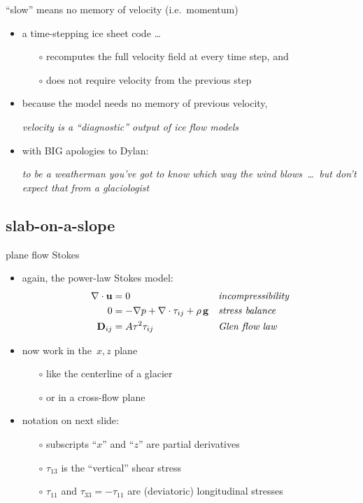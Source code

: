 \begin{frame}{``slow'' means no memory of velocity (i.e.~momentum)}

\begin{itemize}
\item a time-stepping ice sheet code \dots
  \begin{itemize}
  \item[$\circ$] recomputes the full velocity field at every time step, and
  \item[$\circ$] does not require velocity from the previous step
  \end{itemize}

\medskip
\item because the model needs no memory of previous velocity,

\smallskip
\emph{velocity is a ``diagnostic'' output of ice flow models}

\bigskip
\item with BIG apologies to Dylan:

\smallskip
\emph{to be a weatherman you've got to know which way the wind blows \,\dots\, but don't
expect that from a glaciologist}
\end{itemize}
\end{frame}


\subsection{slab-on-a-slope}

\begin{frame}{plane flow Stokes}

\begin{itemize}
\item again, the power-law Stokes model:
\begin{align*}
\nabla \cdot \mathbf{u} &= 0 &&\text{\emph{incompressibility}} \\
0 &= - \nabla p + \nabla \cdot \tau_{ij} + \rho\, \mathbf{g} &&\text{\emph{stress balance}} \\
\mathbf{D}_{ij} &= A \tau^2 \tau_{ij} &&\text{\emph{Glen flow law}}
\end{align*}

\bigskip
\item now work in the\, $x,z$ plane
  \begin{itemize}
  \item[$\circ$] like the centerline of a glacier
  \item[$\circ$] or in a cross-flow plane
  \end{itemize}

\item notation on next slide:
  \begin{itemize}
  \item[$\circ$] subscripts ``$x$'' and ``$z$'' are partial derivatives
  \item[$\circ$] $\tau_{13}$ is the ``vertical'' shear stress
  \item[$\circ$] $\tau_{11}$ and $\tau_{33}=-\tau_{11}$ are (deviatoric) longitudinal stresses 
  \end{itemize}
\end{itemize}
\end{frame}

